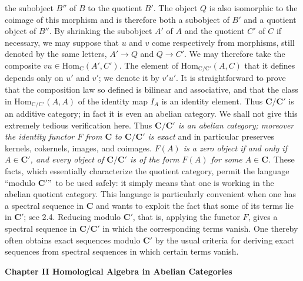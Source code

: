 
\noindent the subobject $B''$ of $B$ to the quotient $B'$. The object $Q$ is
also isomorphic to the coimage of this morphism and is therefore both a
subobject of $B'$ and a quotient object of $B''$. By shrinking the subobject
$A'$ of $A$ and the quotient $C'$ of $C$ if necessary, we may suppose that
$u$ and $v$ come respectively from morphisms, still denoted by the same
letters, $A'\to Q$ and $Q\to C'$. We may therefore
take the composite $vu\in\mathrm{Hom}_{\mathrm{C}}(A',C')$. The element of
$\mathrm{Hom}_{\mathrm{C}/\mathrm{C}'}(A,C)$ that it defines depends only on $u'$ and $v'$; we
denote it by $v'u'$. It is straightforward to prove that the composition law
so defined is bilinear and associative, and that the class in
$\mathrm{Hom}_{\mathrm{C}/\mathrm{C}'}(A,A)$ of the identity map $I_A$ is an identity element.
Thus $\mathbf{C}/\mathbf{C}'$ is an additive category; in fact it is even an abelian category.
We shall not give this extremely tedious verification here.
Thus \textit{$\mathbf{C}/\mathbf{C}'$ is an abelian category; moreover the identity functor $F$
from $\mathbf{C}$ to $\mathbf{C}/\mathbf{C}'$ is exact} and in particular preserves kernels, cokernels,
images, and coimages. \textit{$F(A)$ is a zero object if and only if $A\in \mathbf{C}'$, and
every object of $\mathbf{C}/\mathbf{C}'$ is of the form $F(A)$ for some $A\in \mathbf{C}$.} These facts,
which essentially characterize the quotient category, permit the language
\textquotedblleft modulo $\mathbf{C}'$\textquotedblright\ to be used safely: it simply
means that one is working in the abelian quotient category.
This language is particularly convenient when one has a spectral sequence in
$\mathbf{C}$ and wants to exploit the fact that some of its terms lie in $\mathbf{C}'$; see
2.4. Reducing modulo $\mathbf{C}'$, that is, applying the functor $F$, gives a spectral
sequence in $\mathbf{C}/\mathbf{C}'$ in which the corresponding terms vanish. One thereby
often obtains exact sequences modulo $\mathbf{C}'$ by the usual criteria for deriving
exact sequences from spectral sequences in which certain terms vanish.

\bigskip
\begin{center}
{\normalsize\bfseries Chapter II Homological Algebra in Abelian Categories}
\end{center}

